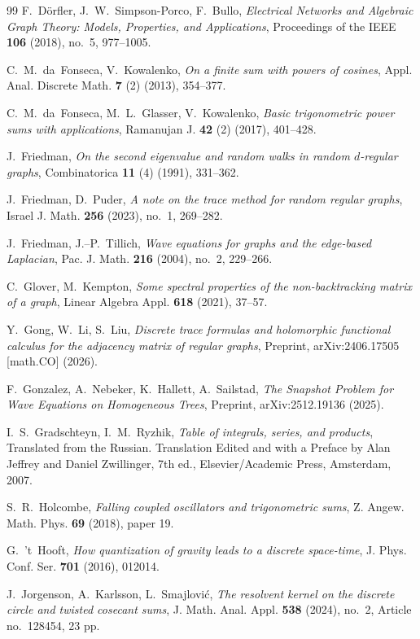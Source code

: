 \documentclass[reqno,10pt]{amsart}
\theoremstyle{definition}
\numberwithin{equation}{section}
\begin{document}
\begin{thebibliography}{99}
 F.~D\"orfler, J.~W.~Simpson-Porco, F.~Bullo, \textit{Electrical Networks and Algebraic Graph Theory: Models, Properties, and Applications}, Proceedings of the IEEE \textbf{106} (2018), no.~5, 977--1005.

 C.~M.~da~Fonseca, V.~Kowalenko, \textit{On a finite sum with powers of cosines}, Appl. Anal. Discrete Math. \textbf{7} (2) (2013),
354--377.

 C.~M.~da~Fonseca, M.~L.~Glasser, V.~Kowalenko, \textit{Basic trigonometric power sums with applications}, Ramanujan J. \textbf{42}
(2) (2017), 401--428.

 J.~Friedman, \textit{On the second eigenvalue and random walks in random $d$-regular graphs}, Combinatorica \textbf{11} (4) (1991), 331--362.

J.~Friedman, D.~Puder, \textit{A note on the trace method for random regular graphs}, Israel J. Math. \textbf{256} (2023), no.~1, 269--282.

 J.~Friedman, J.--P.~Tillich, \textit{Wave equations for graphs and the edge-based Laplacian}, Pac. J. Math. \textbf{216} (2004), no.~2, 229--266.

C.~Glover, M.~Kempton, \textit{Some spectral properties of the non-backtracking matrix of a graph}, Linear Algebra Appl. \textbf{618} (2021), 37--57.

 Y.~Gong, W.~Li, S.~Liu, \textit{Discrete trace formulas and holomorphic functional calculus for the adjacency matrix of regular graphs}, Preprint, arXiv:2406.17505 [math.CO] (2026).

 F.~Gonzalez, A.~Nebeker, K.~Hallett, A.~Sailstad, \textit{The Snapshot Problem for Wave Equations on Homogeneous Trees}, Preprint, arXiv:2512.19136 (2025).

 I.~S.~Gradschteyn, I.~M.~Ryzhik, \textit{Table of integrals,
series, and products}, Translated from the Russian. Translation Edited and
with a Preface by Alan Jeffrey and Daniel Zwillinger, 7th ed., Elsevier/Academic Press, Amsterdam, 2007.

 S.~R.~Holcombe, \textit{Falling coupled oscillators and trigonometric sums}, Z. Angew. Math. Phys. \textbf{69} (2018), paper 19.

  G.~'t~Hooft, \textit{How quantization of gravity leads to a discrete space-time},  J. Phys. Conf. Ser. \textbf{701} (2016), 012014.

J.~Jorgenson, A.~Karlsson, L.~Smajlovi\'{c}, \textit{The resolvent kernel on the discrete circle and twisted cosecant sums}, J. Math. Anal. Appl. \textbf{538} (2024), no.~2, Article no.~128454, 23 pp.


\end{thebibliography}
\end{document}
